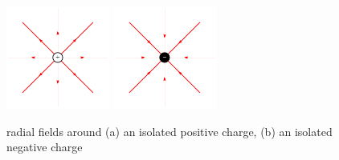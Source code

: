 
\begin{figure}[htp]
	\centering
	\begin{minipage}{0.45\linewidth}
		\centering
		\includegraphics[height=96pt]{pos-charge}
	\end{minipage}
	\begin{minipage}{0.45\linewidth}
		\centering
		\includegraphics[height=96pt]{neg-charge}
	\end{minipage}
	
	\begin{center}
		radial fields around (a) an isolated positive charge, (b) an isolated negative charge
	\end{center}
\end{figure}

